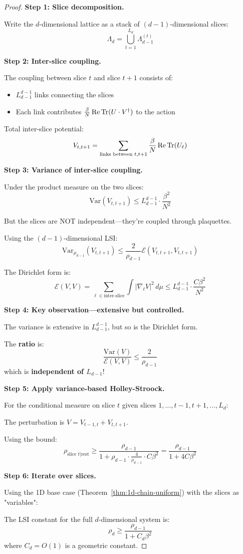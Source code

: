 \begin{proof}
\textbf{Step 1: Slice decomposition.}

Write the $d$-dimensional lattice as a stack of $(d-1)$-dimensional slices:
\[
\Lambda_d = \bigcup_{t=1}^{L_d} \Lambda_{d-1}^{(t)}
\]

\textbf{Step 2: Inter-slice coupling.}

The coupling between slice $t$ and slice $t+1$ consists of:
\begin{itemize}
\item $L_{d-1}^{d-1}$ links connecting the slices
\item Each link contributes $\frac{\beta}{N}\operatorname{Re}\operatorname{Tr}(U \cdot V^\dagger)$ to the action
\end{itemize}

Total inter-slice potential:
\[
V_{t,t+1} = \sum_{\text{links between } t, t+1} \frac{\beta}{N}\operatorname{Re}\operatorname{Tr}(U_\ell)
\]

\textbf{Step 3: Variance of inter-slice coupling.}

Under the product measure on the two slices:
\[
\mathrm{Var}(V_{t,t+1}) \leq L_{d-1}^{d-1} \cdot \frac{\beta^2}{N^2}
\]

But the slices are NOT independent—they're coupled through plaquettes.

Using the $(d-1)$-dimensional LSI:
\[
\mathrm{Var}_{\mu_{d-1}}(V_{t,t+1}) \leq \frac{2}{\rho_{d-1}} \mathcal{E}(V_{t,t+1}, V_{t,t+1})
\]

The Dirichlet form is:
\[
\mathcal{E}(V, V) = \sum_{\ell \in \text{inter-slice}} \int |\nabla_\ell V|^2 \, d\mu \leq L_{d-1}^{d-1} \cdot \frac{C\beta^2}{N^2}
\]

\textbf{Step 4: Key observation—extensive but controlled.}

The variance is extensive in $L_{d-1}^{d-1}$, but so is the Dirichlet form.

The \textbf{ratio} is:
\[
\frac{\mathrm{Var}(V)}{\mathcal{E}(V,V)} \leq \frac{2}{\rho_{d-1}}
\]
which is \textbf{independent of $L_{d-1}$}!

\textbf{Step 5: Apply variance-based Holley-Stroock.}

For the conditional measure on slice $t$ given slices $1, \ldots, t-1, t+1, \ldots, L_d$:

The perturbation is $V = V_{t-1,t} + V_{t,t+1}$.

Using the bound:
\[
\rho_{\text{slice }t | \text{rest}} \geq \frac{\rho_{d-1}}{1 + \rho_{d-1} \cdot \frac{4}{\rho_{d-1}} \cdot C\beta^2} = \frac{\rho_{d-1}}{1 + 4C\beta^2}
\]

\textbf{Step 6: Iterate over slices.}

Using the 1D base case (Theorem~\ref{thm:1d-chain-uniform}) with the slices as "variables":

The LSI constant for the full $d$-dimensional system is:
\[
\rho_d \geq \frac{\rho_{d-1}}{1 + C_d \beta^2}
\]
where $C_d = O(1)$ is a geometric constant.
\end{proof}

